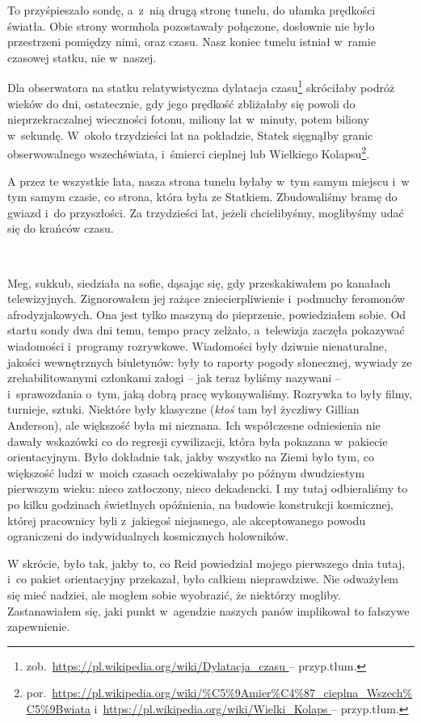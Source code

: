 \documentclass[oneside,polish,11pt,sfheadings]{mwbk}
\begin{document}
To przyśpieszało sondę, a~z~nią drugą stronę tunelu, do ułamka prędkości
światła. Obie strony wormhola pozostawały połączone, dosłownie nie było
przestrzeni pomiędzy nimi, oraz czasu. Nasz koniec tunelu istniał w~ramie czasowej statku, nie w~naszej.

Dla obserwatora na statku relatywistyczna dylatacja czasu\footnote{
zob.~\url{https://pl.wikipedia.org/wiki/Dylatacja_czasu } -- przyp.tłum.} skróciłaby podróż wieków do dni, ostatecznie, gdy jego
prędkość zbliżałaby się powoli do nieprzekraczalnej wieczności fotonu,
miliony lat w~minuty, potem biliony w~sekundę. W~około trzydzieści lat
na pokładzie, Statek sięgnąłby granic obserwowalnego wszechświata, i~śmierci cieplnej lub Wielkiego Kolapsu\footnote{por.~\url{https://pl.wikipedia.org/wiki/\%C5\%9Amier\%C4\%87_cieplna_Wszech\%C5\%9Bwiata}
i~\url{https://pl.wikipedia.org/wiki/Wielki_Kolaps } -- przyp.tłum.}.

 
A przez te wszystkie lata, nasza strona tunelu byłaby w~tym samym
miejscu i~w tym samym czasie, co strona, która była ze Statkiem.
Zbudowaliśmy bramę do gwiazd i~do przyszłości. Za trzydzieści lat,
jeżeli chcielibyśmy, moglibyśmy udać się do krańców czasu.

~

Meg, sukkub, siedziała na sofie, dąsając się, gdy przeskakiwałem po
kanałach telewizyjnych. Zignorowałem jej rażące zniecierpliwienie i~podmuchy feromonów afrodyzjakowych. Ona jest tylko maszyną do
pieprzenie, powiedziałem sobie. Od startu sondy dwa dni temu, tempo
pracy zelżało, a~telewizja zaczęła pokazywać wiadomości i~programy
rozrywkowe. Wiadomości były dziwnie nienaturalne, jakości wewnętrznych
biuletynów: były to raporty pogody słonecznej, wywiady ze
zrehabilitowanymi członkami załogi -- jak teraz byliśmy nazywani -- i~sprawozdania o~tym, jaką dobrą pracę wykonywaliśmy. Rozrywka to były
filmy, turnieje, sztuki. Niektóre były klasyczne (\emph{ktoś} tam był
życzliwy Gillian
Anderson), ale większość była mi nieznana. Ich współczesne
odniesienia nie dawały wskazówki co do regresji cywilizacji, która była
pokazana w~pakiecie orientacyjnym. Było dokładnie tak, jakby wszystko na
Ziemi było tym, co większość ludzi w~moich czasach oczekiwałaby po
późnym dwudziestym pierwszym wieku: nieco zatłoczony, nieco dekadencki.
I my tutaj odbieraliśmy to po kilku godzinach świetlnych opóźnienia, na
budowie konstrukcji kosmicznej, której pracownicy byli z~jakiegoś
niejasnego, ale akceptowanego powodu ograniczeni do indywidualnych
kosmicznych holowników.

W skrócie, było tak, jakby to, co Reid powiedział mojego pierwszego dnia
tutaj, i~co pakiet orientacyjny przekazał, było całkiem nieprawdziwe.
Nie odważyłem się mieć nadziei, ale mogłem sobie wyobrazić, że niektórzy
mogliby. Zastanawiałem się, jaki punkt w~agendzie naszych panów
implikował to fałszywe zapewnienie.
\end{document}
